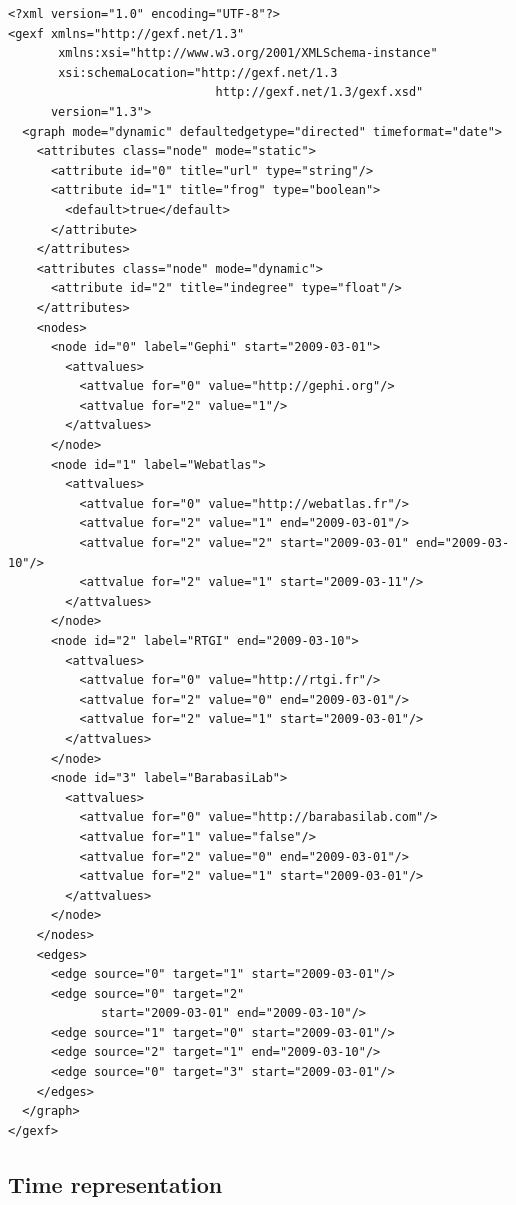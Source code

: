 \documentclass[a4paper,10pt]{article}
\begin{document}
\lstset{ style=gexf }
\begin{lstlisting}[caption={A (small) Dynamic Web Graph with date format},label=dynwebgraph]
<?xml version="1.0" encoding="UTF-8"?>
<gexf xmlns="http://gexf.net/1.3"
       xmlns:xsi="http://www.w3.org/2001/XMLSchema-instance"
       xsi:schemaLocation="http://gexf.net/1.3
                             http://gexf.net/1.3/gexf.xsd"
      version="1.3">
  <graph mode="dynamic" defaultedgetype="directed" timeformat="date">
    <attributes class="node" mode="static">
      <attribute id="0" title="url" type="string"/>
      <attribute id="1" title="frog" type="boolean">
        <default>true</default>
      </attribute>
    </attributes>
    <attributes class="node" mode="dynamic">
      <attribute id="2" title="indegree" type="float"/>
    </attributes>
    <nodes>
      <node id="0" label="Gephi" start="2009-03-01">
        <attvalues>
          <attvalue for="0" value="http://gephi.org"/>
          <attvalue for="2" value="1"/>
        </attvalues>
      </node>
      <node id="1" label="Webatlas">
        <attvalues>
          <attvalue for="0" value="http://webatlas.fr"/>
          <attvalue for="2" value="1" end="2009-03-01"/>
          <attvalue for="2" value="2" start="2009-03-01" end="2009-03-10"/>
          <attvalue for="2" value="1" start="2009-03-11"/>
        </attvalues>
      </node>
      <node id="2" label="RTGI" end="2009-03-10">
        <attvalues>
          <attvalue for="0" value="http://rtgi.fr"/>
          <attvalue for="2" value="0" end="2009-03-01"/>
          <attvalue for="2" value="1" start="2009-03-01"/>
        </attvalues>
      </node>
      <node id="3" label="BarabasiLab">
        <attvalues>
          <attvalue for="0" value="http://barabasilab.com"/>
          <attvalue for="1" value="false"/>
          <attvalue for="2" value="0" end="2009-03-01"/>
          <attvalue for="2" value="1" start="2009-03-01"/>
        </attvalues>
      </node>
    </nodes>
    <edges>
      <edge source="0" target="1" start="2009-03-01"/>
      <edge source="0" target="2"
             start="2009-03-01" end="2009-03-10"/>
      <edge source="1" target="0" start="2009-03-01"/>
      <edge source="2" target="1" end="2009-03-10"/>
      <edge source="0" target="3" start="2009-03-01"/>
    </edges>
  </graph>
</gexf>
\end{lstlisting}

\subsection{Time representation}
\end{document}
